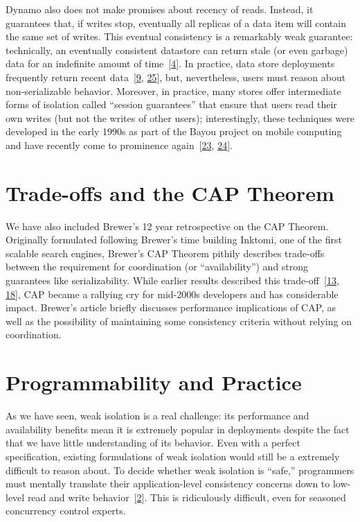 \documentclass[b5paper,11pt,twoside,openright]{book}
\newcommand\Section[2]{
  \hypertarget{#1}{
    \section{#2}\label{#1}
  }
}
\begin{document}
Dynamo also does not make promises about recency of reads. Instead, it
guarantees that, if writes stop, eventually all replicas of a data item
will contain the same set of writes. This eventual consistency is a
remarkably weak guarantee: technically, an eventually consistent
datastore can return stale (or even garbage) data for an indefinite
amount of time~{{[}\protect\hyperlink{ref-ec-queue}{4}{]}}. In practice,
data store deployments frequently return recent
data~{{[}\protect\hyperlink{ref-pbs}{9},
  \protect\hyperlink{ref-wada}{25}{]}}, but, nevertheless, users must
reason about non-serializable behavior. Moreover, in practice, many
stores offer intermediate forms of isolation called ``session
guarantees'' that ensure that users read their own writes (but not the
writes of other users); interestingly, these techniques were developed
in the early 1990s as part of the Bayou project on mobile computing and
have recently come to prominence
again~{{[}\protect\hyperlink{ref-terry-baseball}{23},
  \protect\hyperlink{ref-bayou-session}{24}{]}}.

\Section{trade-offs-and-the-cap-theorem}{
Trade-offs and the CAP Theorem
}

We have also included Brewer's 12 year retrospective on the CAP Theorem.
Originally formulated following Brewer's time building Inktomi, one of
the first scalable search engines, Brewer's CAP Theorem pithily
describes trade-offs between the requirement for coordination (or
``availability'') and strong guarantees like serializability. While
earlier results described this
trade-off~{{[}\protect\hyperlink{ref-davidson-survey}{13},
  \protect\hyperlink{ref-caprfc}{18}{]}}, CAP became a rallying cry for
mid-2000s developers and has considerable impact. Brewer's article
briefly discusses performance implications of CAP, as well as the
possibility of maintaining some consistency criteria without relying on
coordination.

\Section{programmability-and-practice}{%
Programmability and Practice
}

As we have seen, weak isolation is a real challenge: its performance and
availability benefits mean it is extremely popular in deployments
despite the fact that we have little understanding of its behavior. Even
with a perfect specification, existing formulations of weak isolation
would still be a extremely difficult to reason about. To decide whether
weak isolation is ``safe,'' programmers must mentally translate their
application-level consistency concerns down to low-level read and write
behavior~{{[}\protect\hyperlink{ref-consistency-borders}{2}{]}}. This is
ridiculously difficult, even for seasoned concurrency control experts.
\end{document}
